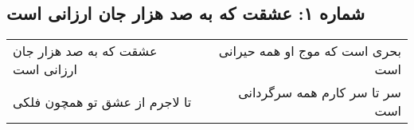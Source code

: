 \begin{center}
\section*{شماره ۱: عشقت که به صد هزار جان ارزانی است}
\label{sec:001}
\begin{longtable}{l p{0.5cm} r}
عشقت که به صد هزار جان ارزانی است
&&
بحری است که موج او همه حیرانی است
\\
تا لاجرم از عشق تو همچون فلکی
&&
سر تا سر کارم همه سرگردانی است
\\
\end{longtable}
\end{center}
